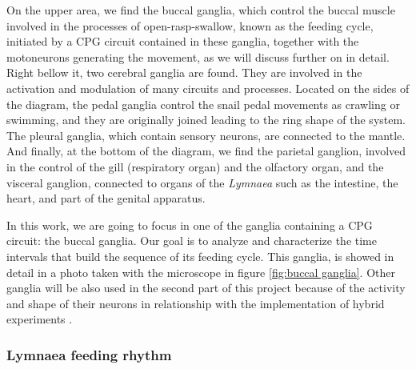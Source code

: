 
On the upper area, we find the buccal ganglia, which control the buccal muscle involved in the processes of open-rasp-swallow, known as the feeding cycle, initiated by a CPG circuit contained in these ganglia, together with the motoneurons generating the movement, as we will discuss further on in detail. Right bellow it, two cerebral ganglia are found. They are involved in the activation and modulation of many circuits and processes. Located on the sides of the diagram, the pedal ganglia control the snail pedal movements as crawling or swimming, and they are originally joined leading to the ring shape of the system. The pleural ganglia, which contain sensory neurons, are connected to the mantle. And finally, at the bottom of the diagram, we find the parietal ganglion, involved in the control of the gill (respiratory organ) and the olfactory organ, and the visceral ganglion, connected to organs of the \textit{Lymnaea} such as the intestine, the heart, and part of the genital apparatus.

In this work, we are going to focus in one of the ganglia containing a CPG circuit: the buccal ganglia. Our goal is to analyze and characterize the time intervals that build the sequence of its feeding cycle. This ganglia, is showed in detail in
a photo taken with the microscope in figure \ref{fig:buccal ganglia}. Other ganglia will be also used in the second part of this project because of the activity and shape of their neurons in relationship with the implementation of hybrid experiments \cite{GarridoPena2019}.


\subsubsection{Lymnaea feeding rhythm}

